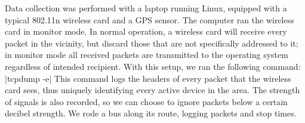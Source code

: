 Data collection was performed with a laptop running Linux, equipped with a typical 802.11n wireless card and a GPS sensor.
The computer ran the wireless card in monitor mode.
In normal operation, a wireless card will receive every packet in the vicinity, but discard those that are not specifically addressed to it; in monitor mode all received packets are transmitted to the operating system regardless of intended recipient. With this setup, we ran the following command:
|tcpdump -e|
This command logs the headers of every packet that the wireless card sees, thus uniquely identifying every active device in the area.
The strength of signals is also recorded, so we can choose to ignore packets below a certain decibel strength.
We rode a bus along its route, logging packets and stop times.

